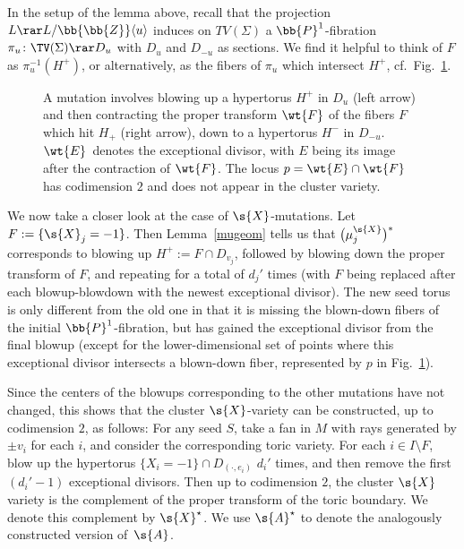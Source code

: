 In the setup of the lemma above, recall that the projection $L\rar L/\bb{\bb{Z}}\langle u \rangle$ induces on $TV(\Sigma)$ a $\bb{P}^1$-fibration $\pi_u\colon \TV(\Sigma)\rar D_u$ with $D_u$ and $D_{-u}$ as sections. We find it helpful to think of $F$ as $\pi_u^{-1}(H^+)$, or alternatively, as the fibers of $\pi_u$ which intersect $H^+$, cf.\ Fig.~\ref{mutation-fig}.

\begin{figure}[t]\centering
{}
\caption{A mutation involves blowing up a hypertorus $H^+$ in $D_{u}$ (left arrow) and then contracting the proper transform $\wt{F}$ of the fibers $F$ which hit $H_+$ (right arrow), down to a hypertorus $H^-$ in $D_{-u}$. $\wt{E}$~denotes the exceptional divisor, with $E$ being its image after the contraction of $\wt{F}$. The locus $p=\wt{E}\cap\wt{F}$ has codimension $2$ and does not appear in the cluster variety.}\label{mutation-fig}
\end{figure}

We now take a closer look at the case of $\s{X}$-mutations. Let $F:=\{\s{X}_j = -1\}$. Then Lemma~\ref{mugeom} tells us that $\big(\mu_j^{\s{X}}\big)^*$ corresponds to blowing up $H^+:=F \cap D_{v_j}$, followed by blowing down the proper transform of $F$, and repeating for a total of $d_j'$ times (with $F$ being replaced after each blowup-blowdown with the newest exceptional divisor). The new seed torus is only different from the old one in that it is missing the blown-down fibers of the initial $\bb{P}^1$-fibration, but has gained the exceptional divisor from the final blowup (except for the lower-dimensional set of points where this exceptional divisor intersects a blown-down fiber, represented by $p$ in Fig.~\ref{mutation-fig}).

Since the centers of the blowups corresponding to the other mutations have not changed, this shows that the cluster $\s{X}$-variety can be constructed, up to codimension $2$, as follows: For any seed $S$, take a fan in $M$ with rays generated by $\pm v_i$ for each $i$, and consider the corresponding toric variety. For each $i\in I\setminus F$, blow up the hypertorus $\{X_i=-1\}\cap D_{(\cdot,e_{i})}$ $d_i'$ times, and then remove the first $(d_i'-1)$ exceptional divisors. Then up to codimension $2$, the cluster $\s{X}$ variety is the complement of the proper transform of the toric boundary. We denote this complement by $\s{X}^{\star}$. We use $\s{A}^{\star}$ to denote the analogously constructed version of~$\s{A}$.

